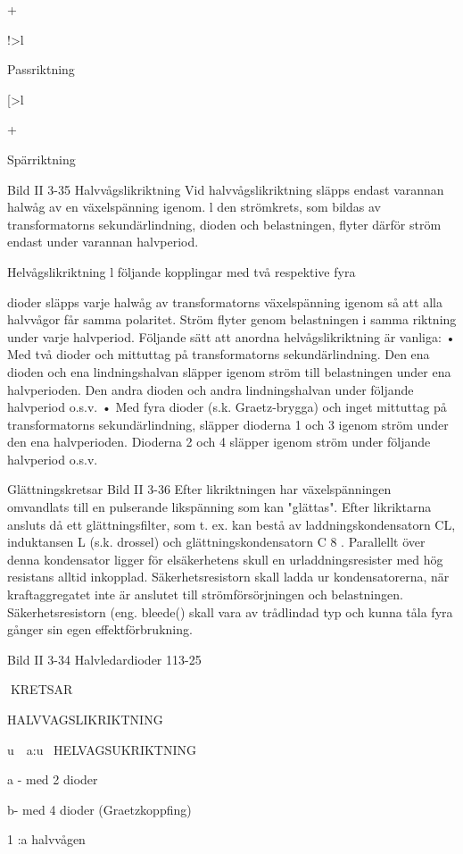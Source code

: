 \documentclass[a4paper,twoside,twocolumn,openright]{book}
\begin{document}
{{{{{{{+

!>l

Passriktning

[>l

+

Spärriktning

Bild II 3-35
Halvvågslikriktning
Vid halvvågslikriktning släpps endast varannan halwåg av en växelspänning igenom. l
den strömkrets, som bildas av transformatorns sekundärlindning, dioden och belastningen, flyter därför ström endast under
varannan halvperiod.

Helvågslikriktning
l följande kopplingar med två respektive fyra

dioder släpps varje halwåg av transformatorns växelspänning igenom så att alla halvvågor får samma polaritet. Ström flyter genom belastningen i samma riktning under
varje halvperiod. Följande sätt att anordna
helvågslikriktning är vanliga:
• Med två dioder och mittuttag på transformatorns sekundärlindning. Den ena dioden och ena lindningshalvan släpper igenom ström till belastningen under ena halvperioden. Den andra dioden och andra
lindningshalvan under följande halvperiod
o.s.v.
• Med fyra dioder (s.k. Graetz-brygga) och
inget mittuttag på transformatorns sekundärlindning, släpper dioderna 1 och 3 igenom ström under den ena halvperioden.
Dioderna 2 och 4 släpper igenom ström
under följande halvperiod o.s.v.

Glättningskretsar
Bild II 3-36
Efter likriktningen har växelspänningen omvandlats till en pulserande likspänning som
kan "glättas". Efter likriktarna ansluts då ett
glättningsfilter, som t. ex. kan bestå av laddningskondensatorn CL, induktansen L (s.k.
drossel) och glättningskondensatorn C 8 .
Parallellt över denna kondensator ligger för
elsäkerhetens skull en urladdningsresister
med hög resistans alltid inkopplad.
Säkerhetsresistorn skall ladda ur kondensatorerna, när kraftaggregatet inte är
anslutet till strömförsörjningen och belastningen. Säkerhetsresistorn (eng. bleede()
skall vara av trådlindad typ och kunna tåla
fyra gånger sin egen effektförbrukning.

Bild II 3-34 Halvledardioder
113-25

KRETSAR

HALVVAGSLIKRIKTNING

u~~a:u~
HELVAGSUKRIKTNING

a - med 2 dioder

b- med 4 dioder
(Graetzkoppfing)

1 :a halvvågen

}}}}}}}
\end{document}
